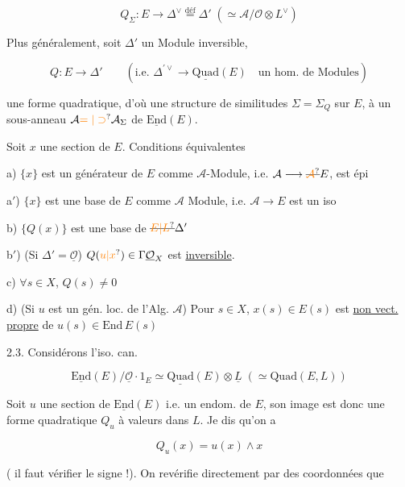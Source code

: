 \[
Q_\Sigma:E\longrightarrow\Delta^\vee\overset{\mathrm{déf}}{=}\Delta' \;(\simeq\mathcal A/\mathcal O\otimes L^\vee)
\]

 Plus généralement, soit $\Delta'$ un Module inversible,

\[
Q:E\longrightarrow\Delta'\qquad(\text{i.e. }\Delta^{\prime\vee}\longrightarrow\underline{\mathrm{Quad}}(E)\quad\text{un hom. de Modules})
\]

une forme quadratique, d'où une structure de similitudes $\Sigma=\Sigma_Q$ sur $E$,  à un sous-anneau $\mathcal A\unsure{=|\supset}\mathcal A_\Sigma$ de $\underline{\mathrm{End}}(E)$.

Soit $x$ une section de $E$. Conditions équivalentes

a) $\{x\}$ est un générateur de $E$ comme $\mathcal A$-Module, i.e.  $\mathcal A\longrightarrow\deleted{\unsure{\mathcal A}}E$, est épi

a$'$)  $\{x\}$ est une base de $E$ comme $\mathcal A$ Module, i.e.  $\mathcal A\longrightarrow E$ est un iso

b) $\{Q(x)\}$ est une base de $\deleted{\unsure{E|L}}\Delta'$

b$'$) (Si $\Delta'=\underline{\mathcal O}$) $Q(\unsure{u|x})\in\Gamma\underline{\mathcal O}_X$ est \uline{inversible}.

c) $\forall s\in X$, $Q(s)\ne0$


d) (Si $u$ est un gén. loc. de l'Alg. $\mathcal A$) Pour  $s\in X$, $x(s)\in E(s)$ est \uline{non vect.} \uline{propre} de $u(s)\in\mathrm{End}\,E(s)$

2.3. Considérons  l'iso. can.

\[
\underline{\mathrm{End}}(E)/\underline{\mathcal O}\cdot1_E\simeq\underline{\mathrm{Quad}}(E)\otimes\underline L\;(\simeq\mathrm{Quad}(E,L))
\]

Soit $u$ une section de $\underline{\mathrm{End}}(E)$ i.e. un endom. de $E$,  son image est donc une forme quadratique $Q_u$ à valeurs dans $L$. Je dis qu'on a

\[
\boxed{Q_u(x)=u(x)\wedge x}
\]

( il faut vérifier le signe !).  On revérifie directement par des coordonnées que

